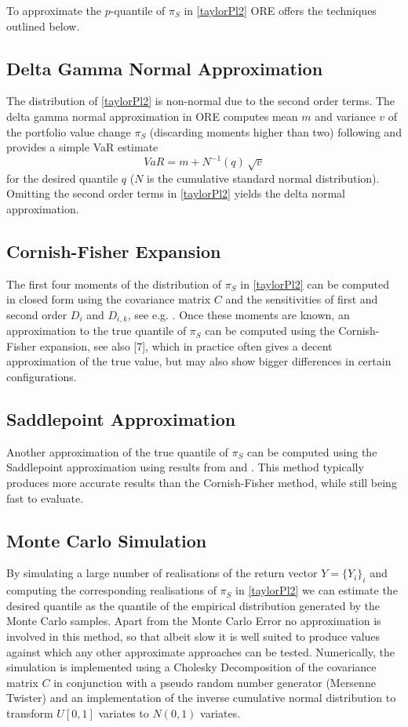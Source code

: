To approximate the $p$-quantile of $\pi_S$ in \eqref{taylorPl2} ORE offers the techniques outlined below.

\subsection{Delta Gamma Normal Approximation}

The distribution of \eqref{taylorPl2} is non-normal due to the second order terms.
The delta gamma normal approximation in ORE computes mean $m$ and variance $v$ of the portfolio value change $\pi_S$ (discarding moments higher than two) following \cite{alexander} and provides a simple VaR estimate
$$
VaR = m + N^{-1}(q)\,\sqrt{v}
$$
for the desired quantile $q$ ($N$ is the cumulative standard normal distribution). Omitting the second order terms in \eqref{taylorPl2} yields the delta normal approximation.

\subsection{Cornish-Fisher Expansion}

The first four moments of the distribution of $\pi_S$ in \eqref{taylorPl2} can be computed in closed form using the covariance matrix $C$ and the sensitivities of first and second order $D_i$
and $D_{i,k}$, see e.g. \cite{alexander}. Once these moments are known, an approximation to the true quantile of $\pi_S$ can be computed using the Cornish-Fisher expansion, see also [7], which in practice often gives a decent approximation of the true value, but may also show bigger differences in certain configurations.

\subsection{Saddlepoint Approximation}

Another approximation of the true quantile of $\pi_S$ can be computed using the Saddlepoint approximation using results from \cite{Lugannani} and \cite{Daniels}. This method typically produces more accurate results than the Cornish-Fisher method, while still being fast to evaluate.

\subsection{Monte Carlo Simulation}

By simulating a large number of realisations of the return vector $Y=\{ Y_i \}_i$ and computing the corresponding
realisations of $\pi_S$ in \eqref{taylorPl2} we can estimate the desired quantile as the quantile of the empirical
distribution generated by the Monte Carlo samples. Apart from the Monte Carlo Error no approximation is involved in this
method, so that albeit slow it is well suited to produce values against which any other approximate approaches can be tested. Numerically, the simulation is implemented using a Cholesky Decomposition
of the covariance matrix $C$ in conjunction with a pseudo random number generator (Mersenne Twister) and an
implementation of the inverse cumulative normal distribution to transform $U[0,1]$ variates to $N(0,1)$ variates.
